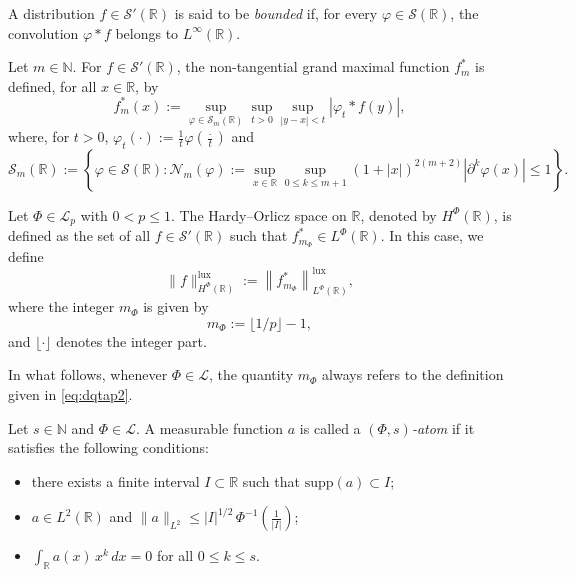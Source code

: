 \documentclass[a4paper,12pt,intlimits,oneside]{amsart}
\theoremstyle{definition}
\numberwithin{equation}{section}
\theoremstyle{definition}
\begin{document}
\medskip

A distribution $f \in \mathscr{S}'(\mathbb{R})$ is said to be \emph{bounded} if, for every $\varphi \in \mathscr{S}(\mathbb{R})$, the convolution $\varphi \ast f$ belongs to $L^{\infty}(\mathbb{R})$.

\medskip


Let $m \in \mathbb{N}$. For $f \in \mathscr{S}'(\mathbb{R})$, the non-tangential grand maximal function $f_m^*$ is defined, for all $x \in \mathbb{R}$, by
\[
f_m^*(x) := \sup_{\varphi \in \mathcal{S}_m(\mathbb{R})} \sup_{t>0} \sup_{|y-x|<t} \left| \varphi_t \ast f(y) \right|,
\]
where, for $t>0$, $\varphi_t(\cdot) := \frac{1}{t}\varphi\!\left(\frac{\cdot}{t}\right)$ and
\[
\mathcal{S}_m(\mathbb{R}) := \left\{ \varphi \in \mathscr{S}(\mathbb{R}) : 
\mathcal{N}_m(\varphi) := \sup_{x \in \mathbb{R}} \sup_{0 \leq k \leq m+1} (1+|x|)^{2(m+2)} |\partial^k \varphi(x)| \leq 1 \right\}.
\]

\medskip

Let $\Phi \in \mathscr{L}_p$ with $0 < p \leq 1$. The Hardy--Orlicz space on $\mathbb{R}$, denoted by $H^\Phi(\mathbb{R})$, is defined as the set of all $f \in \mathscr{S}'(\mathbb{R})$ such that $f_{m_\Phi}^* \in L^\Phi(\mathbb{R})$. In this case, we define
\[
\|f\|_{H^\Phi(\mathbb{R})}^{\mathrm{lux}} := \left\| f_{m_\Phi}^* \right\|_{L^\Phi(\mathbb{R})}^{\mathrm{lux}},
\]
where the integer $m_\Phi$ is given by
\begin{equation}\label{eq:dqtap2}
m_\Phi := \lfloor 1/p \rfloor - 1,
\end{equation}
and $\lfloor \cdot \rfloor$ denotes the integer part.

\medskip

In what follows, whenever $\Phi \in \mathscr{L}$, the quantity $m_\Phi$ always refers to the definition given in \eqref{eq:dqtap2}.

\medskip

Let $s \in \mathbb{N}$ and $\Phi \in \mathscr{L}$. A measurable function $a$ is called a \emph{$(\Phi,s)$-atom} if it satisfies the following conditions:
\begin{itemize}
\item[(i)] there exists a finite interval $I \subset \mathbb{R}$ such that $\mathrm{supp}(a) \subset I$;
\item[(ii)] $a \in L^2(\mathbb{R})$ and $\|a\|_{L^2} \leq |I|^{1/2}\,\Phi^{-1}\!\left(\frac{1}{|I|}\right)$;
\item[(iii)] $\displaystyle \int_{\mathbb{R}} a(x)\,x^k\,dx = 0$ for all $0 \leq k \leq s$.
\end{itemize}
\end{document}
